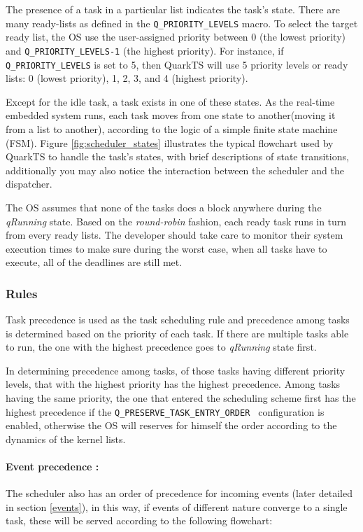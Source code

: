 

The presence of a task in a particular list indicates the task's state. 
There are many ready-lists as defined in the \lstinline{Q_PRIORITY_LEVELS} macro.
To select the target ready list, the OS use the user-assigned priority between 0 (the lowest priority) and \lstinline{Q_PRIORITY_LEVELS-1} (the highest priority). For instance, if \lstinline{Q_PRIORITY_LEVELS} is set to 5, then QuarkTS will use 5 priority levels or ready lists: 0 (lowest priority), 1, 2, 3, and 4 (highest priority). 

Except for the idle task, a task exists in one of these states. As the real-time embedded system runs, each task moves from one state to another(moving it from a list to another), according to the logic of a simple finite state machine (FSM). Figure \ref{fig:scheduler_states} illustrates the typical flowchart used by QuarkTS to handle the task's states, with brief descriptions of state transitions, additionally you may also notice the interaction between the scheduler and the dispatcher.

The OS assumes that none of the tasks does a block anywhere during the \textit{qRunning} state. Based on the \textit{round-robin} fashion, each ready task runs in turn from every ready lists. The developer should take care to monitor their system execution times to make sure during the worst case, when all tasks have to execute, all of the deadlines are still met.


\subsubsection{Rules}
Task precedence is used as the task scheduling rule and precedence among tasks is determined based on the priority of each task. If there are multiple tasks able to run, the one with the highest precedence goes to \textit{qRunning} state first. 

In determining precedence among tasks, of those tasks having different priority levels, that with the highest priority has the highest precedence. Among tasks having the same priority, the one that entered the scheduling scheme first has the highest precedence if the \lstinline{Q_PRESERVE_TASK_ENTRY_ORDER } configuration is enabled, otherwise the OS will reserves for himself the order according to the dynamics of the kernel lists.

\paragraph{Event precedence :}
The scheduler also has an order of precedence for incoming events (later detailed in section \ref{events}), in this way, if events of different nature converge to a single task, these will be served according to the following flowchart:

